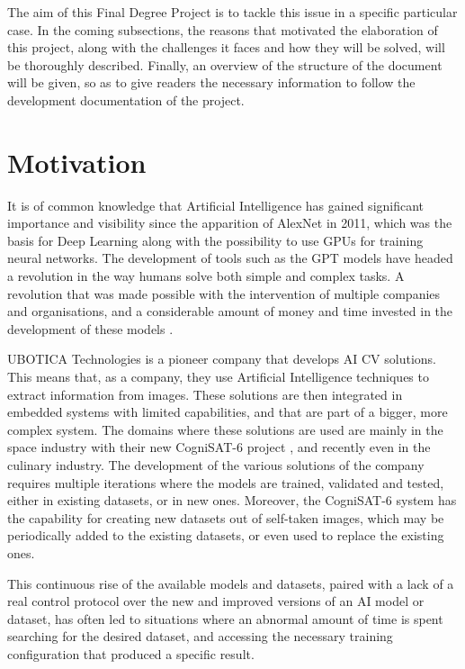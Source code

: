 The aim of this Final Degree Project is to tackle this issue in a specific particular case. In the coming subsections, the reasons that motivated the elaboration
of this project, along with the challenges it faces and how they will be solved, will be thoroughly described. Finally, an overview of the structure of the document
will be given, so as to give readers the necessary information to follow the development documentation of the project.

\section{Motivation}

It is of common knowledge that Artificial Intelligence has gained significant importance and visibility since the apparition of AlexNet in 2011, which was the basis for Deep Learning along with the possibility
to use GPUs for training neural networks. The development of tools such as the GPT models
have headed a revolution in the way humans solve both simple and complex tasks. A revolution that was made possible with the intervention of multiple
companies and organisations, and a considerable amount of money and time invested in the development of these models \cite{AIRise}.

UBOTICA Technologies is a pioneer company that develops \acrshort{AI} \acrfull{CV} solutions. This means that, as a company, they use Artificial Intelligence
techniques to extract information from images. These solutions are then integrated in embedded systems with limited capabilities, and that are part of a 
bigger, more complex system. The domains where these solutions are used are mainly in the space industry with their new CogniSAT-6 project \cite{UBOTICACS6}, 
and recently even in the culinary industry. The development of the various solutions of the company requires multiple iterations where the models are trained,
validated and tested, either in existing datasets, or in new ones. Moreover, the CogniSAT-6 system has the capability for creating new datasets out of self-taken
images, which may be periodically added to the existing datasets, or even used to replace the existing ones.

This continuous rise of the available models and datasets, paired with a lack of a real control protocol over the new and improved versions of an AI model or dataset,
has often led to situations where an abnormal amount of time is spent searching for the desired dataset, and accessing the necessary training configuration
that produced a specific result.

